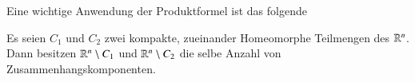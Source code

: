 Eine wichtige Anwendung der Produktformel ist das folgende
\begin{theorem}\label{2.16}
Es seien $C_1$ und $C_2$ zwei kompakte, zueinander Homeomorphe Teilmengen des $\mathbb{R}^n$. Dann besitzen
$\mathbb{R}^n\setminus C_1$ und $\mathbb{R}^n\setminus C_2$ die selbe Anzahl von Zusammenhangskomponenten.
\end{theorem}
